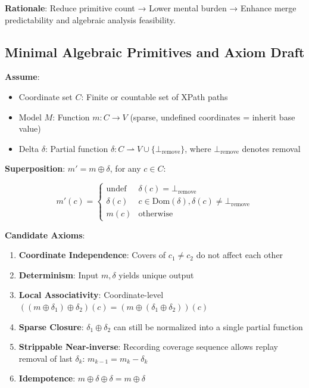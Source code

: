 \documentclass[11pt]{article}
\begin{document}
\textbf{Rationale}: Reduce primitive count → Lower mental burden → Enhance merge predictability and algebraic analysis feasibility.

\subsection{Minimal Algebraic Primitives and Axiom Draft}

\textbf{Assume}:

\begin{itemize}
\item Coordinate set $C$: Finite or countable set of XPath paths
\item Model $M$: Function $m: C \to V$ (sparse, undefined coordinates = inherit base value)
\item Delta $\delta$: Partial function $\delta: C \rightharpoonup V \cup \{\bot_{\text{remove}}\}$, where $\bot_{\text{remove}}$ denotes removal
\end{itemize}

\textbf{Superposition}: $m' = m \oplus \delta$, for any $c \in C$:

\[
m'(c) = \begin{cases}
   \text{undef} & \delta(c) = \bot_{\text{remove}}\\
   \delta(c) & c \in \text{Dom}(\delta), \delta(c) \neq \bot_{\text{remove}}\\
   m(c) & \text{otherwise}
 \end{cases}
\]

\textbf{Candidate Axioms}:

\begin{enumerate}
\item \textbf{Coordinate Independence}: Covers of $c_1 \neq c_2$ do not affect each other
\item \textbf{Determinism}: Input $m, \delta$ yields unique output
\item \textbf{Local Associativity}: Coordinate-level $((m \oplus \delta_1) \oplus \delta_2)(c) = (m \oplus (\delta_1 \oplus \delta_2))(c)$
\item \textbf{Sparse Closure}: $\delta_1 \oplus \delta_2$ can still be normalized into a single partial function
\item \textbf{Strippable Near-inverse}: Recording coverage sequence allows replay removal of last $\delta_k$: $m_{k-1} = m_k - \delta_k$
\item \textbf{Idempotence}: $m \oplus \delta \oplus \delta = m \oplus \delta$
\end{enumerate}
\end{document}
